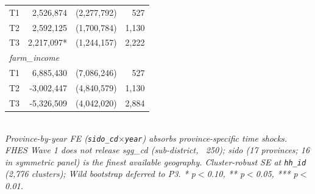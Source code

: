 \begin{table}[t]
\begin{tabular}{lrrr}
T1 & 2,526,874 & (2,277,792) & 527 \\
T2 & 2,592,125 & (1,700,784) & 1,130 \\
T3 & 2,217,097* & (1,244,157) & 2,222 \\
\multicolumn{4}{l}{\textit{farm\_income}} \\
T1 & 6,885,430 & (7,086,246) & 527 \\
T2 & -3,002,447 & (4,840,579) & 1,130 \\
T3 & -5,326,509 & (4,042,020) & 2,884 \\
\bottomrule
\end{tabular}
\\
\footnotesize\textit{Province-by-year FE (\texttt{sido\_cd}$\times$\texttt{year}) absorbs province-specific time shocks. FHES Wave 1 does not release sgg\_cd (sub-district, ~250); sido (17 provinces; 16 in symmetric panel) is the finest available geography. Cluster-robust SE at \texttt{hh\_id} (2,776 clusters); Wild bootstrap deferred to P3. * p$<$0.10, ** p$<$0.05, *** p$<$0.01.}
\end{table}
